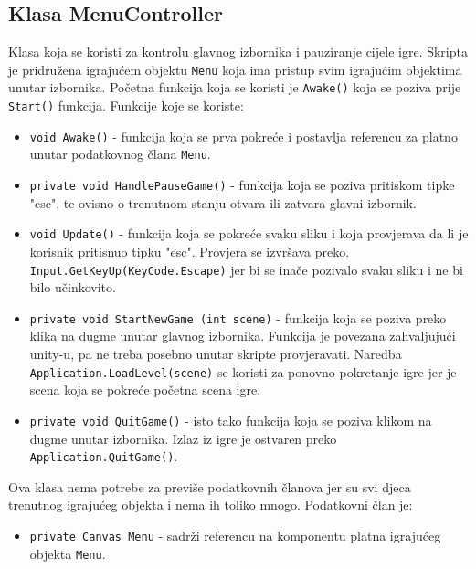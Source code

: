 \subsection{Klasa MenuController}
Klasa koja se koristi za kontrolu glavnog izbornika i pauziranje cijele igre. Skripta je pridružena igrajućem objektu \texttt{Menu} koja ima pristup svim igrajućim objektima unutar izbornika. Početna funkcija koja se koristi je \texttt{Awake()} koja se poziva prije \texttt{Start()} funkcija. Funkcije koje se koriste:
\begin{itemize}
	\item \texttt{void Awake()} - funkcija koja se prva pokreće i postavlja referencu za platno unutar podatkovnog člana \texttt{Menu}.
	\item \texttt{private void HandlePauseGame()} - funkcija koja se poziva pritiskom tipke "esc", te ovisno o trenutnom stanju otvara ili zatvara glavni izbornik.
	\item \texttt{void Update()} - funkcija koja se pokreće svaku sliku i koja provjerava da li je korisnik pritisnuo tipku "esc". Provjera se izvršava preko. \texttt{Input.GetKeyUp(KeyCode.Escape)} jer bi se inače pozivalo svaku sliku i ne bi bilo učinkovito.
	\item \texttt{private void StartNewGame (int scene)} - funkcija koja se poziva preko klika na dugme unutar glavnog izbornika. Funkcija je povezana zahvaljujući unity-u, pa ne treba posebno unutar skripte provjeravati. Naredba \texttt{Application.LoadLevel(scene)} se koristi za ponovno pokretanje igre jer je scena koja se pokreće početna scena igre.
	\item \texttt{private void QuitGame()} - isto tako funkcija koja se poziva klikom na dugme unutar izbornika. Izlaz iz igre je ostvaren preko \newline \texttt{Application.QuitGame()}.
\end{itemize}
Ova klasa nema potrebe za previše podatkovnih članova jer su svi djeca trenutnog igrajućeg objekta i nema ih toliko mnogo. Podatkovni član je:
\begin{itemize}
	\item \texttt{private Canvas Menu} - sadrži referencu na komponentu platna igrajućeg objekta \texttt{Menu}.
\end{itemize}
\newpage
